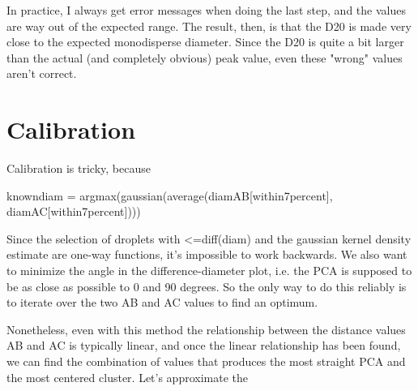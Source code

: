 \documentclass[11.5pt]{book}
\begin{document}
In practice, I always get error messages when doing the last step, and the
values are way out of the expected range. The result, then, is that the D20 is
made very close to the expected monodisperse diameter. Since the D20 is quite
a bit larger than the actual (and completely obvious) peak value, even these
"wrong" values aren't correct.

\section{Calibration}
Calibration is tricky, because 

knowndiam = argmax(gaussian(average(diamAB[within7percent], diamAC[within7percent])))

Since the selection of droplets with <=diff(diam) and the gaussian kernel
density estimate are one-way functions, it's impossible to work backwards. We
also want to minimize the angle in the difference-diameter plot, i.e. the PCA is
supposed to be as close as possible to 0 and 90 degrees. So the only way to do
this reliably is to iterate over the two AB and AC values to find an optimum.

Nonetheless, even with this method the relationship between the distance values
AB and AC is typically linear, and once the linear relationship has been found,
we can find the combination of values that produces the most straight PCA and
the most centered cluster. Let's approximate the 





\end{document}
